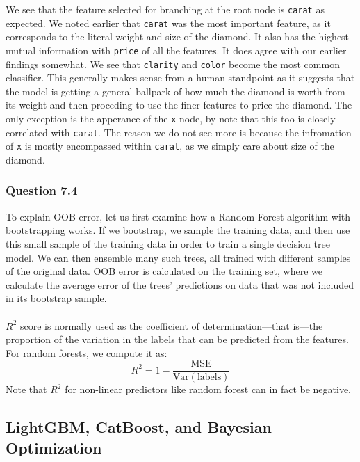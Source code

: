 \documentclass[11pt,letterpaper]{article}
\begin{document}
We see that the feature selected for branching at the root node is \texttt{carat} as 
expected. We noted earlier that \texttt{carat} was the most important feature, as it 
corresponds to the literal weight and size of the diamond. It also has the highest mutual 
information with \texttt{price} of all the features. It does agree with our earlier 
findings somewhat. We see that \texttt{clarity} and \texttt{color} become the most common
classifier. This generally makes sense from a human standpoint as it suggests that 
the model is getting a general ballpark of how much the diamond is worth from its weight 
and then proceding to use the finer features to price the diamond. The only exception 
is the apperance of the \texttt{x} node, by note that this too is closely correlated with 
\texttt{carat}. The reason we do not see more is because the infromation of \texttt{x} is
mostly encompassed within \texttt{carat}, as we simply care about size of the diamond. 


\subsubsection*{Question 7.4}
To explain OOB error, let us first examine how a Random Forest algorithm with
bootstrapping works. If we bootstrap, we sample the training data, and then use 
this small sample of the training data in order to train a single decision tree model.
We can then ensemble many such trees, all trained with different samples of the original
data. OOB error is calculated on the training set, where we calculate the average error 
of the trees' predictions on data that was not included in its bootstrap sample. \\\\
$R^2$ score is normally used as the coefficient of determination—that is—the proportion
of the variation in the labels that can be predicted from the features. For random 
forests, we compute it as:
\[R^2 = 1- \dfrac{\text{MSE}}{\text{Var}(\text{labels})}
    \]
Note that $R^2$ for non-linear predictors like random forest can in fact be negative.



\subsection*{LightGBM, CatBoost, and Bayesian Optimization}
\end{document}
